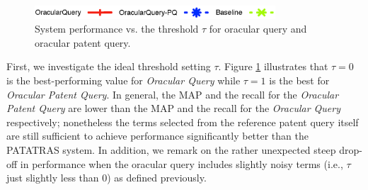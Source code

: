 \begin{figure}[t!]
\begin{centering}
\includegraphics[width=9cm]{imgs/legend}
\par\end{centering}

\begin{centering}
\par\end{centering}

\protect\caption{System performance vs. the threshold $\tau$ for oracular query and oracular patent query.}
\label{fig:oracular}
\end{figure}

First, we investigate the ideal threshold setting $\tau$.
Figure \ref{fig:oracular} illustrates that $\tau=0$ is the
best-performing value for \emph{ Oracular Query} while $\tau=1$ is the
best for \emph{ Oracular Patent Query}. In general, the MAP and the recall for the \emph{Oracular
Patent Query} are lower than the MAP and the recall for the \emph{Oracular Query} respectively;
nonetheless the terms selected from the reference patent query itself are
still sufficient to achieve performance significantly better than the PATATRAS system. In addition, we remark on the rather
unexpected steep drop-off in performance when the oracular query
includes slightly noisy terms (i.e., $\tau$ just slightly less than 0)
as defined previously.

